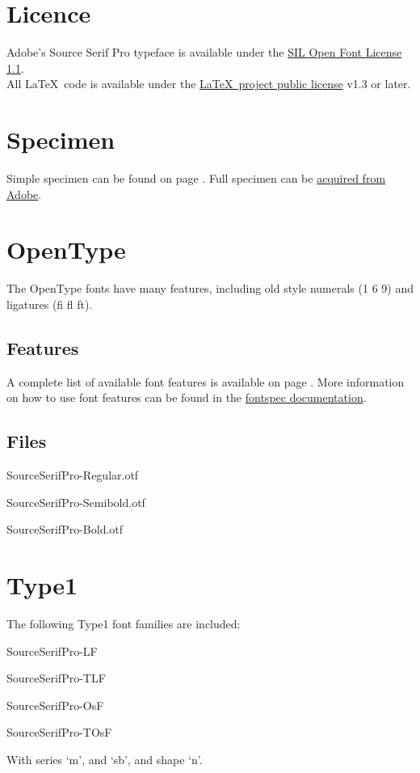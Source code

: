 \documentclass[11pt,a4paper,english]{article}
\begin{document}
\begin{multicols}{2}
\section{Licence}
Adobe's Source Serif Pro typeface is available under the \href{http://scripts.sil.org/OFL}{SIL Open Font License 1.1}.\\
All \LaTeX\ code is available under the \href{http://www.latex-project.org/lppl/}{\LaTeX\ project public license} v1.3 or later.

\section{Specimen}
Simple specimen can be found on page \pageref{sec:specimen}. Full specimen can be \href{http://store1.adobe.com/type/browser/pdfs/1966.pdf}{acquired from Adobe}.

\section{OpenType}
The OpenType fonts have many features, including old style numerals (1 6 9) and ligatures (fi fl ft).

\subsection{Features}
A complete list of available font features is available on page \pageref{sec:otfinfo}. More information on how to use font features can be found in the \href{http://mirror.ctan.org/macros/latex/contrib/fontspec/fontspec.pdf}{fontspec documentation}.

\subsection{Files}
\begin{itemize*}
	\item SourceSerifPro-Regular.otf
	\item SourceSerifPro-Semibold.otf
	\item SourceSerifPro-Bold.otf
\end{itemize*}

\section{Type1}
The following Type1 font families are included:
\begin{itemize*}
	\item SourceSerifPro-LF
	\item SourceSerifPro-TLF
	\item SourceSerifPro-OsF
	\item SourceSerifPro-TOsF
\end{itemize*}
With series ‘m’, and ‘sb’, and shape ‘n’.


\end{multicols}
\end{document}
